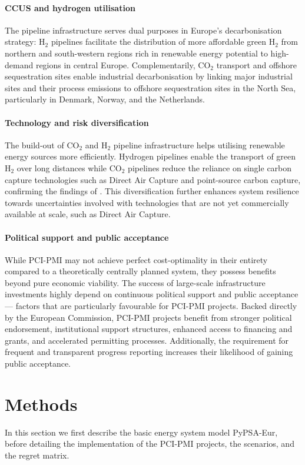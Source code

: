 \documentclass[pdflatex,sn-nature]{sn-jnl}%
\theoremstyle{thmstyleone}%
\theoremstyle{thmstyletwo}%
\theoremstyle{thmstylethree}%
\begin{document}
\paragraph{CCUS and hydrogen utilisation}
The pipeline infrastructure serves dual purposes in Europe's decarbonisation strategy: H$_2$ pipelines facilitate the distribution of more affordable green H$_2$ from northern and south-western regions rich in renewable energy potential to high-demand regions in central Europe. Complementarily, CO$_2$ transport and offshore sequestration sites enable industrial decarbonisation by linking major industrial sites and their process emissions to offshore sequestration sites in the North Sea, particularly in Denmark, Norway, and the Netherlands.

\paragraph{Technology and risk diversification}
The build-out of CO$_2$ and H$_2$ pipeline infrastructure helps utilising renewable energy sources more efficiently. Hydrogen pipelines enable the transport of green H$_2$ over long distances while CO$_2$ pipelines reduce the reliance on single carbon capture technologies such as Direct Air Capture and point-source carbon capture, confirming the findings of \cite{hofmannH2CO2Network2025}. This diversification further enhances system resilience towards uncertainties involved with technologies that are not yet commercially available at scale, such as Direct Air Capture.

\paragraph{Political support and public acceptance} 
While PCI-PMI may not achieve perfect cost-optimality in their entirety compared to a theoretically centrally planned system, they possess benefits beyond pure economic viability. The success of large-scale infrastructure investments highly depend on continuous political support and public acceptance --- factors that are particularly favourable for PCI-PMI projects.
Backed directly by the European Commission, PCI-PMI projects benefit from stronger political endorsement, institutional support structures, enhanced access to financing and grants, and accelerated permitting processes. Additionally, the requirement for frequent and transparent progress reporting increases their likelihood of gaining public acceptance.

\section*{Methods}\label{sec:methods}
In this section we first describe the basic energy system model PyPSA-Eur, before detailing the implementation of the PCI-PMI projects, the scenarios, and the regret matrix.
\end{document}
